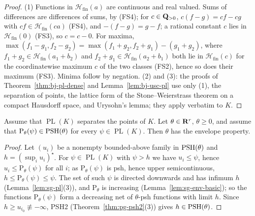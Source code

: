 \begin{proof}
(1) Functions in $\mathcal H_{\mathrm{fin}}(a)$ are continuous and real valued. Sums of differences are differences of sums,
by (FS4); for $c\in\mathbf{Q}_{>0}$, $c(f-g)=cf-cg$ with $cf\in\mathcal H_{\mathrm{fin}}(ca)$ (FS4), and $-(f-g)=g-f$; a rational constant $c$
lies in $\mathcal H_{\mathrm{fin}}(0)$ (FS3), so $c=c-0$. For maxima,
$\max(f_1-g_1,f_2-g_2)=\max(f_1+g_2,f_2+g_1)-(g_1+g_2)$, where $f_1+g_2\in\mathcal H_{\mathrm{fin}}(a_1+b_2)$ and
$f_2+g_1\in\mathcal H_{\mathrm{fin}}(a_2+b_1)$ both lie in $\mathcal H_{\mathrm{fin}}(c)$ for the coordinatewise maximum $c$ of the two
classes (FS2), hence so does their maximum (FS3). Minima follow by negation.
(2) and (3): the proofs of Theorem~\ref{thm:bj-pl-dense} and Lemma~\ref{lem:bj-usc-pl} use only (1), the separation of
points, the lattice form of the Stone--Weierstrass theorem on a compact Hausdorff space, and Urysohn's lemma; they apply
verbatim to $K$.
\end{proof}

\begin{proposition}\label{prop:sg-envelope-criterion}
\leanok
{}
Assume that $\operatorname{PL}(K)$ separates the points of $K$. Let $\theta\in\mathbf{R}^r$, $\theta\ge0$, and assume that
$\mathrm P_\theta(\psi)\in\operatorname{PSH}(\theta)$ for every $\psi\in\operatorname{PL}(K)$. Then $\theta$ has the envelope property.
\end{proposition}

\begin{proof}
Let $(u_i)$ be a nonempty bounded-above family in $\operatorname{PSH}(\theta)$ and $h=(\sup_iu_i)^\star$. For $\psi\in\operatorname{PL}(K)$ with
$\psi>h$ we have $u_i\le\psi$, hence $u_i\le\mathrm P_\theta(\psi)$ for all $i$; as $\mathrm P_\theta(\psi)$ is psh, hence upper
semicontinuous, $h\le\mathrm P_\theta(\psi)\le\psi$. The set of such $\psi$ is directed downwards and has infimum $h$
(Lemma~\ref{lem:sg-pl}(3)), and $\mathrm P_\theta$ is increasing (Lemma~\ref{lem:sg-env-basic}); so the functions
$\mathrm P_\theta(\psi)$ form a decreasing net of $\theta$-psh functions with limit $h$. Since $h\ge u_{i_0}\not\equiv-\infty$,
PSH2 (Theorem~\ref{thm:pg-psh2}(3)) gives $h\in\operatorname{PSH}(\theta)$.
\end{proof}

